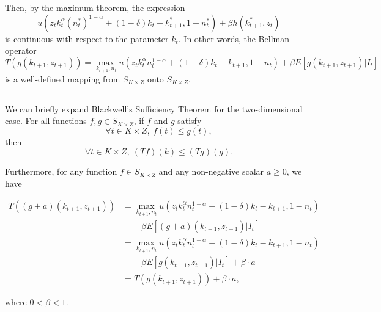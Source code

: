 \documentclass{article}
\begin{document}
Then, by the maximum theorem, the expression
\begin{equation}
    u\left(z_t k_t^\alpha (n^*_t)^{1-\alpha} + (1-\delta) k_t - k^*_{t+1}, 1 - n^*_t\right) + \beta h(k^*_{t+1},z_{t})
\end{equation}
is continuous with respect to the parameter $k_t$. In other words, the Bellman operator
\begin{equation}
    T(g(k_{t+1},z_{t+1})) = \max_{k_{t+1},n_t} u\left(z_t k_t^\alpha n_t^{1-\alpha} + (1-\delta) k_t - k_{t+1}, 1 - n_t\right) + \beta E[g(k_{t+1},z_{t+1})|I_t]
\end{equation}
is a well-defined mapping from $S_{K \times Z}$ onto $S_{K \times Z}$.


\subsection{}
We can briefly expand Blackwell's Sufficiency Theorem for the two-dimensional case. For all functions $f, g \in S_{K \times Z}$, if $f$ and $g$ satisfy
\begin{equation}
    \forall t \in K \times Z, \ f(t) \leq g(t),
\end{equation}
then
\begin{equation}
    \forall t \in K \times Z, \ (Tf)(k) \leq (Tg)(g).
\end{equation}

Furthermore, for any function $f \in S_{K \times Z}$ and any non-negative scalar $a \geq 0$, we have

\begin{align}
    T((g+a)(k_{t+1},z_{t+1})) &= \max_{k_{t+1},n_t} u\left(z_t k_t^\alpha n_t^{1-\alpha} + (1-\delta) k_t - k_{t+1}, 1 - n_t\right) \\
    &\quad + \beta E[(g+a)(k_{t+1},z_{t+1})|I_t] \\
    &= \max_{k_{t+1},n_t} u\left(z_t k_t^\alpha n_t^{1-\alpha} + (1-\delta) k_t - k_{t+1}, 1 - n_t\right) \\
    &\quad + \beta E[g(k_{t+1},z_{t+1})|I_t] + \beta \cdot a \\
    &= T(g(k_{t+1},z_{t+1})) + \beta \cdot a,
\end{align}

where $0 < \beta < 1$. \\
\end{document}
